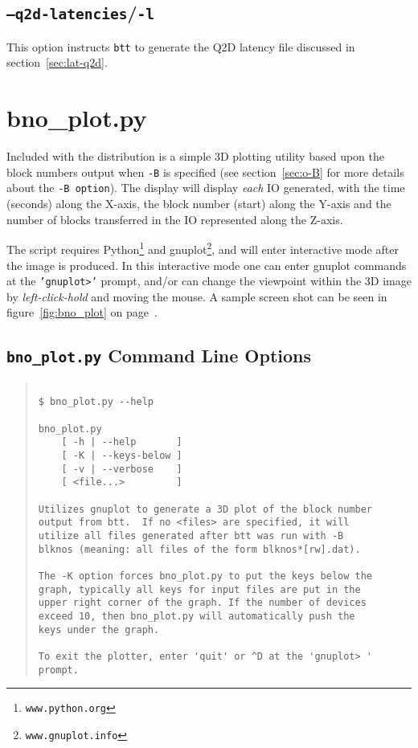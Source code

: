 \documentclass{article}
\begin{document}
\subsection{\label{sec:o-z}\texttt{--q2d-latencies}/\texttt{-l}}

  This option instructs \texttt{btt} to generate the Q2D latency file
  discussed in section~\ref{sec:lat-q2d}.

\newpage\section{\label{sec:bno_plot}bno\_plot.py}

Included with the distribution is a simple 3D plotting utility based
upon the block numbers output when \texttt{-B} is specified (see
section~\ref{sec:o-B} for more details about the \texttt{-B option}). The
display will display \emph{each} IO generated, with the time (seconds)
along the X-axis, the block number (start) along the Y-axis and the
number of blocks transferred in the IO represented along the Z-axis.

The script requires Python\footnote{\texttt{www.python.org}} and
gnuplot\footnote{\texttt{www.gnuplot.info}}, and will enter interactive
mode after the image is produced. In this interactive mode one can enter
gnuplot commands at the \texttt{'gnuplot>'} prompt, and/or can change
the viewpoint within the 3D image by \emph{left-click-hold} and moving
the mouse. A sample screen shot can be seen in figure~\ref{fig:bno_plot} on
page~\pageref{fig:bno_plot}.

\subsection*{\texttt{bno\_plot.py} Command Line Options}

\begin{quotation}
\begin{verbatim}

$ bno_plot.py --help

bno_plot.py
	[ -h | --help       ]
	[ -K | --keys-below ]
	[ -v | --verbose    ]
	[ <file...>         ]

Utilizes gnuplot to generate a 3D plot of the block number
output from btt.  If no <files> are specified, it will
utilize all files generated after btt was run with -B
blknos (meaning: all files of the form blknos*[rw].dat).

The -K option forces bno_plot.py to put the keys below the
graph, typically all keys for input files are put in the
upper right corner of the graph. If the number of devices
exceed 10, then bno_plot.py will automatically push the
keys under the graph.

To exit the plotter, enter 'quit' or ^D at the 'gnuplot> '
prompt.
\end{verbatim}
\end{quotation}
\end{document}
